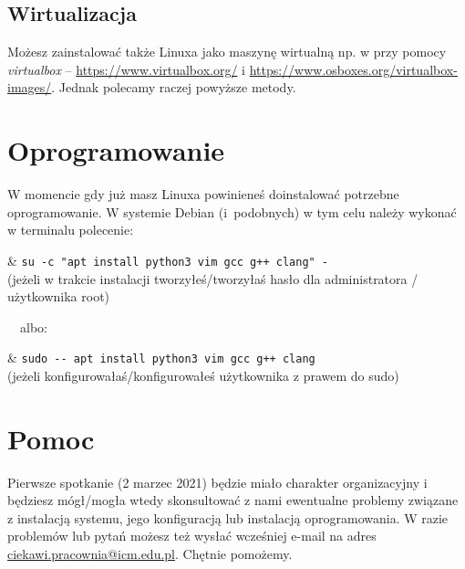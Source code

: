 \documentclass{pdfBooklets}
\begin{document}
\subsection{Wirtualizacja}

Możesz zainstalować także Linuxa jako maszynę wirtualną np. w przy pomocy \textit{virtualbox} – \url{https://www.virtualbox.org/} i \url{https://www.osboxes.org/virtualbox-images/}. Jednak polecamy raczej powyższe metody.


\section{Oprogramowanie}

W momencie gdy już masz Linuxa powinieneś doinstalować potrzebne oprogramowanie.
W systemie Debian (i~podobnych) w tym celu należy wykonać w terminalu polecenie:
\vspace{3pt}\begin{easylist}[itemize]
	& \Verb#su -c "apt install python3 vim gcc g++ clang" -#\\ (jeżeli w trakcie instalacji tworzyłeś/tworzyłaś hasło dla administratora / użytkownika root)
\end{easylist}
\vspace{3pt}\noindent  albo:
\vspace{3pt}\begin{easylist}[itemize]
	& \Verb#sudo -- apt install python3 vim gcc g++ clang#\\ (jeżeli konfigurowałaś/konfigurowałeś użytkownika z prawem do sudo)
\end{easylist}


\section{Pomoc}

Pierwsze spotkanie (2 marzec 2021) będzie miało charakter organizacyjny i będziesz mógł/mogła wtedy skonsultować z nami ewentualne problemy związane z instalacją systemu, jego konfiguracją lub instalacją oprogramowania.
W razie problemów lub pytań możesz też wysłać wcześniej e-mail na adres \url{ciekawi.pracownia@icm.edu.pl}. Chętnie pomożemy.


\end{document}
